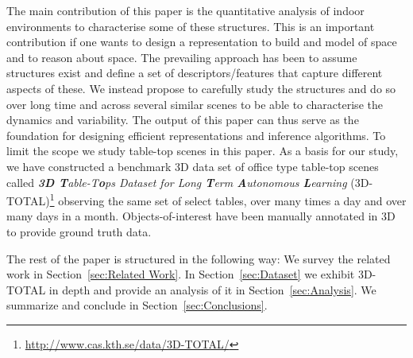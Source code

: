 \documentclass[letterpaper, 10 pt, conference]{ieeeconf}  %
\begin{document}
The main contribution of this paper is the quantitative analysis of
indoor environments to characterise some of these structures. This is
an important contribution if one wants to design a representation to
build and model of space and to reason about space.  The prevailing
approach has been to assume structures exist and define a set of
descriptors/features that capture different aspects of these. We
instead propose to carefully study the structures and do so over long
time and across several similar scenes to be able to characterise the
dynamics and variability. The output of this paper can thus serve as
the foundation for designing efficient representations and inference
algorithms. To limit the scope we study table-top scenes in this
paper. As a basis for our study, we have constructed a benchmark 3D
data set of office type table-top scenes called \textit{\textbf{3D
    T}able-T\textbf{o}ps Dataset for Long \textbf{T}erm
  \textbf{A}utonomous \textbf{L}earning} (3D-
TOTAL)\footnote{\url{http://www.cas.kth.se/data/3D-TOTAL/}} observing
the same set of select tables, over many times a day and over many
days in a month. Objects-of-interest have been manually annotated in
3D to provide ground truth data.

The rest of the paper is structured in the following way: We survey the related work in Section~\ref{sec:Related Work}. In Section~\ref{sec:Dataset} we exhibit 3D-TOTAL in depth and provide an 
analysis of it in Section~\ref{sec:Analysis}. We summarize and conclude in Section~\ref{sec:Conclusions}.


\end{document}

